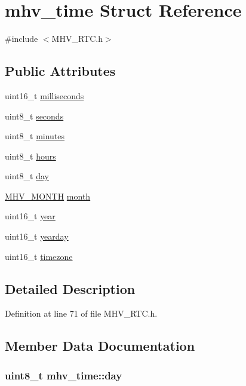 \hypertarget{structmhv__time}{\section{mhv\-\_\-time Struct Reference}
\label{structmhv__time}
}


{\ttfamily \#include $<$M\-H\-V\-\_\-\-R\-T\-C.\-h$>$}

\subsection*{Public Attributes}
\begin{DoxyCompactItemize}
\item 
uint16\-\_\-t \hyperlink{structmhv__time_a88f1e6b1d010c2f21b11bd335b1fae65}{milliseconds}
\item 
uint8\-\_\-t \hyperlink{structmhv__time_a4844293af0a3648391fb9335f2aa758c}{seconds}
\item 
uint8\-\_\-t \hyperlink{structmhv__time_a72c1e9925d2d3de254c6550c0b309347}{minutes}
\item 
uint8\-\_\-t \hyperlink{structmhv__time_a86216ab6b58bede2c74b8b38745c81f7}{hours}
\item 
uint8\-\_\-t \hyperlink{structmhv__time_aa20dafe05aae315fff313d53656c6318}{day}
\item 
\hyperlink{_m_h_v___r_t_c_8h_a98c5fb7fa4cf35056e932e294af7cbb5}{M\-H\-V\-\_\-\-M\-O\-N\-T\-H} \hyperlink{structmhv__time_a832c57e459789022fb39b7c704a3e926}{month}
\item 
uint16\-\_\-t \hyperlink{structmhv__time_ab5441551ca64fde709afdc98fa5c851e}{year}
\item 
uint16\-\_\-t \hyperlink{structmhv__time_aa5e9d8969550c007c40f6b2dd404d3d6}{yearday}
\item 
uint16\-\_\-t \hyperlink{structmhv__time_abe9ad1b2bfd43e6688c07367a279c50b}{timezone}
\end{DoxyCompactItemize}


\subsection{Detailed Description}


Definition at line 71 of file M\-H\-V\-\_\-\-R\-T\-C.\-h.



\subsection{Member Data Documentation}
\hypertarget{structmhv__time_aa20dafe05aae315fff313d53656c6318}{
\subsubsection[{day}]{\setlength{\rightskip}{0pt plus 5cm}uint8\-\_\-t mhv\-\_\-time\-::day}}\label{structmhv__time_aa20dafe05aae315fff313d53656c6318}


